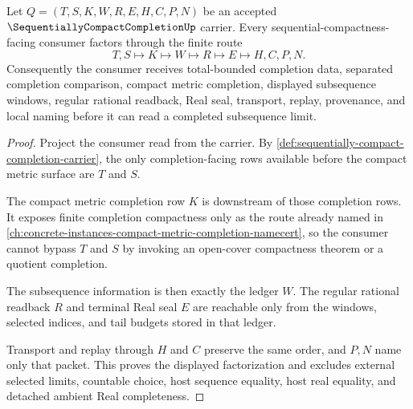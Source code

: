 \begin{theorem}
\label{thm:sequentially-compact-completion-subsequence-seal}
Let $Q=(T,S,K,W,R,E,H,C,P,N)$ be an accepted $\SequentiallyCompactCompletionUp$ carrier. Every sequential-compactness-facing consumer factors through the finite route
$$
T,S \longmapsto K \longmapsto W \longmapsto R \longmapsto E \longmapsto H,C,P,N .
$$
Consequently the consumer receives total-bounded completion data, separated completion comparison, compact metric completion, displayed subsequence windows, regular rational readback, Real seal, transport, replay, provenance, and local naming before it can read a completed subsequence limit.
\end{theorem}
\begin{proof}
Project the consumer read from the carrier. By \autoref{def:sequentially-compact-completion-carrier}, the only completion-facing rows available before the compact metric surface are $T$ and $S$.

The compact metric completion row $K$ is downstream of those completion rows. It exposes finite completion compactness only as the route already named in \autoref{ch:concrete-instances-compact-metric-completion-namecert}, so the consumer cannot bypass $T$ and $S$ by invoking an open-cover compactness theorem or a quotient completion.

The subsequence information is then exactly the ledger $W$. The regular rational readback $R$ and terminal Real seal $E$ are reachable only from the windows, selected indices, and tail budgets stored in that ledger.

Transport and replay through $H$ and $C$ preserve the same order, and $P,N$ name only that packet. This proves the displayed factorization and excludes external selected limits, countable choice, host sequence equality, host real equality, and detached ambient Real completeness.
\end{proof}



